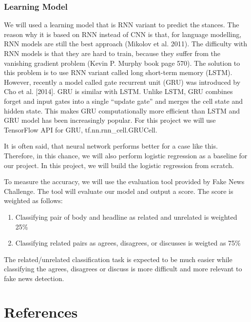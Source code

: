 \documentclass[12pt]{article}
\begin{document}
\subsubsection{Learning Model}

We will used a learning model that is  RNN variant to predict the stances. 
The reason why it is based on RNN instead of CNN is that, for language 
modelling, RNN models are still the best approach (Mikolov et al. 2011). 
The difficulty with RNN models is that they are hard to train, because they 
suffer from the vanishing gradient problem (Kevin P. Murphy book page 570). 
The solution to this problem is to use RNN variant called long short-term memory
(LSTM). However, recently a model called gate recurrent unit (GRU) was 
introduced by Cho et al. [2014]. GRU is similar with LSTM. Unlike LSTM, GRU 
combines forget and input gates into a single “update gate” and merges the cell
state and hidden state. This makes GRU computationally more efficient than 
LSTM and GRU model has been increasingly popular. For this project we will use 
TensorFlow API for GRU, tf.nn.rnn\_cell.GRUCell. 

It is often said, that neural network performs better for a case like this. 
Therefore, in this chance, we will also perform logistic regression as a 
baseline for our project. In this project, we will build the logistic 
regression from scratch. 

To measure the accuracy, we will use the evaluation tool provided by 
Fake News Challenge. The tool will evaluate our model and output a score. 
The score is weighted as follows:
\begin{enumerate}
    \item Classifying pair of body and headline as related and unrelated is 
      weighted 25\%
    \item Classifying related pairs as agrees, disagrees, or discusses is 
      weigted as 75\%
\end{enumerate}
The related/unrelated classification task is expected to be much easier while classifying the agrees, disagrees or discuss 
is more difficult and more relevant to fake news detection.

\section{References}
\end{document}
